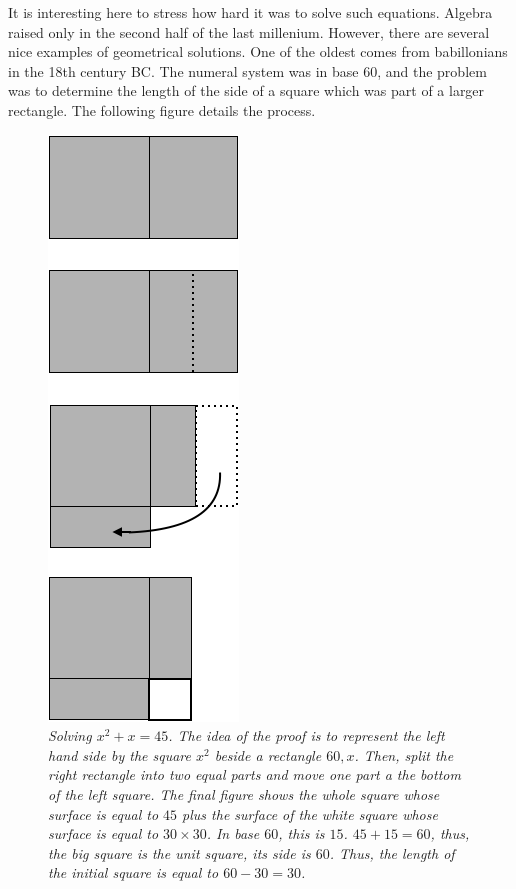 {\Denis It is interesting here to stress how hard it was to solve such equations. Algebra raised only in the second half of the last millenium.
However, there are several nice examples of geometrical solutions.
One of the oldest comes from babillonians in the 18th century BC.
The numeral system was in base 60, and the problem was to determine the length of the side of a square which was part of a larger rectangle.
The following figure details the process.}
\begin{figure}[htb]
\begin{center}
       \includegraphics[scale=0.3]{FiguresArithmetic/tabletteMesopotamie}
\caption{{\it Solving $x^2 + x = 45$.
The idea of the proof is to represent the left hand side by the square $x^2$ beside a rectangle $60,x$.
Then, split the right rectangle into two equal parts and move one part a the bottom of the left square.
The final figure shows the whole square whose surface is equal to $45$ plus the surface of the white square
whose surface is equal to $30 \times 30$.
In base $60$, this is $15$. 
$45+15 = 60$, thus, the big square is the unit square, its side is $60$.
Thus, the length of the initial square is equal to $60-30=30$.}
\label{fig:equationBabillon}}
\end{center}
\end{figure}


